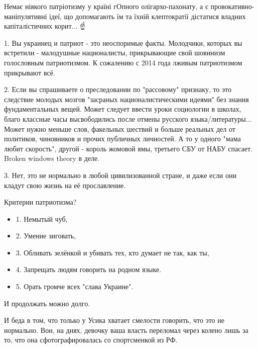 \begin{itemize}
Немає ніякого патріотизму у країні гОпного олігархо-пахонату, а є
провокативно-маніпулятивні ідеї, що допомагають їм та їхній клептократії
дістатися владних капіталістичних корит... ☝️🤔😏

 

1. Вы украинец и патриот - это неоспоримые факты. Молодчики, которых вы
встретили - малодушные националисты, прикрывающие свой шовинизм голословным
патриотизмом. К сожалению с 2014 года лживым патриотизмом прикрывают всё.

2. Если вы спрашиваете о преследовании по "рассовому" признаку, то это
следствие молодых мозгов "засраных националистическими идеями" без знания
фундаментальных вещей. Может следует ввести уроки социологии в школах, благо
классные часы высвободились после отмены русского языка/литературы... Может
нужно меньше слов, факельных шествий и больше реальных дел от политиков,
чиновников и прочих публичных личностей. А то у одного "мама любит скорость",
другой - король жомовой ямы, третьего СБУ от НАБУ спасает. Broken windows
theory в деле.

3. Нет, это не нормально в любой цивилизованной стране, и даже если они кладут
свою жизнь на её прославление.

 

Критерии патриотизма?

\begin{itemize}
  \item 1. Немытый чуб,
  \item 2. Умение зиговать,
  \item 3. Обливать зелёнкой и убивать тех, кто думает не так, как ты,
  \item 4. Запрещать людям говорить на родном языке.
  \item 5. Орать громче всех "слава Украине".
\end{itemize}

И продолжать можно долго.

И беда в том, что только у Усика хватает смелости говорить, что это не
нормально. Вон, на днях, девочку ваша власть переломал через колено лишь за то,
что она сфотографировалась со спортсменкой из РФ.


\end{itemize}
